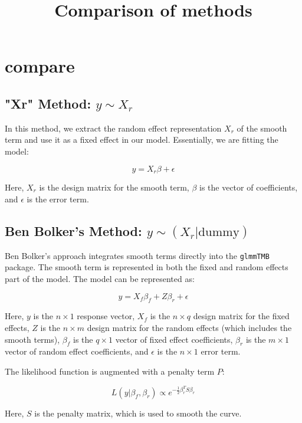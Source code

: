 \documentclass{article}
\title{Comparison of methods}
\author{}
\date{}
\begin{document}
\maketitle

\section{compare}

\subsection{"Xr" Method: \(y \sim X_r\)}

In this method, we extract the random effect representation \(X_r\) of the smooth term and use it as a fixed effect in our model. Essentially, we are fitting the model:

\begin{equation}
y = X_r \beta + \epsilon
\end{equation}

Here, \(X_r\) is the design matrix for the smooth term, \(\beta\) is the vector of coefficients, and \(\epsilon\) is the error term.

\subsection{Ben Bolker's Method: \(y \sim (X_r | \text{dummy})\)}

Ben Bolker's approach integrates smooth terms directly into the \texttt{glmmTMB} package. The smooth term is represented in both the fixed and random effects part of the model. The model can be represented as:

\[
y = X_f \beta_f + Z \beta_r + \epsilon
\]

Here, \(y\) is the \(n \times 1\) response vector, \(X_f\) is the \(n \times q\) design matrix for the fixed effects, \(Z\) is the \(n \times m\) design matrix for the random effects (which includes the smooth terms), \(\beta_f\) is the \(q \times 1\) vector of fixed effect coefficients, \(\beta_r\) is the \(m \times 1\) vector of random effect coefficients, and \(\epsilon\) is the \(n \times 1\) error term.

The likelihood function is augmented with a penalty term \(P\):

\[
L(y | \beta_f, \beta_r) \propto e^{-\frac{1}{2} \beta_r^T S \beta_r}
\]

Here, \(S\) is the penalty matrix, which is used to smooth the curve.
\end{document}
